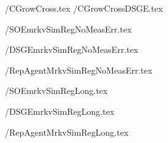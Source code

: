 \documentclass{\econtex}\usepackage{\econtexSetup}\usepackage{\econtexShortcuts}\newcommand{\texname}{Tables}
\begin{document}



\newlength\TableWidth 

 \eq/CGrowCross.tex
 \TabsDir/CGrowCrossDSGE.tex

 \TabsDir/SOEmrkvSimRegNoMeasErr.tex

 \TabsDir/DSGEmrkvSimRegNoMeasErr.tex

 \TabsDir/RepAgentMrkvSimRegNoMeasErr.tex

 \TabsDir/SOEmrkvSimRegLong.tex

 \TabsDir/DSGEmrkvSimRegLong.tex

 \TabsDir/RepAgentMrkvSimRegLong.tex



\end{document}
